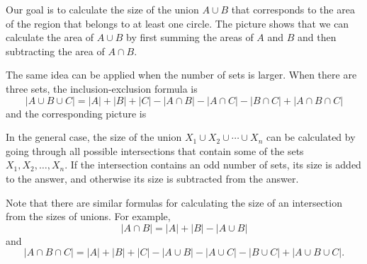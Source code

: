 \begin{center}
\end{center}

Our goal is to calculate
the size of the union $A \cup B$
that corresponds to the area of the region
that belongs to at least one circle.
The picture shows that we can calculate
the area of $A \cup B$ by first summing the
areas of $A$ and $B$ and then subtracting
the area of $A \cap B$.

The same idea can be applied when the number
of sets is larger.
When there are three sets, the inclusion-exclusion formula is
\[ |A \cup B \cup C| = |A| + |B| + |C| - |A \cap B|  - |A \cap C|  - |B \cap C| + |A \cap B \cap C| \]
and the corresponding picture is

\begin{center}
\end{center}

In the general case, the size of the
union $X_1 \cup X_2 \cup \cdots \cup X_n$
can be calculated by going through all possible
intersections that contain some of the sets $X_1,X_2,\ldots,X_n$.
If the intersection contains an odd number of sets,
its size is added to the answer,
and otherwise its size is subtracted from the answer.

Note that there are similar formulas
for calculating
the size of an intersection from the sizes of
unions. For example,
\[ |A \cap B| = |A| + |B| - |A \cup B|\]
and
\[ |A \cap B \cap C| = |A| + |B| + |C| - |A \cup B|  - |A \cup C|  - |B \cup C| + |A \cup B \cup C| .\]

